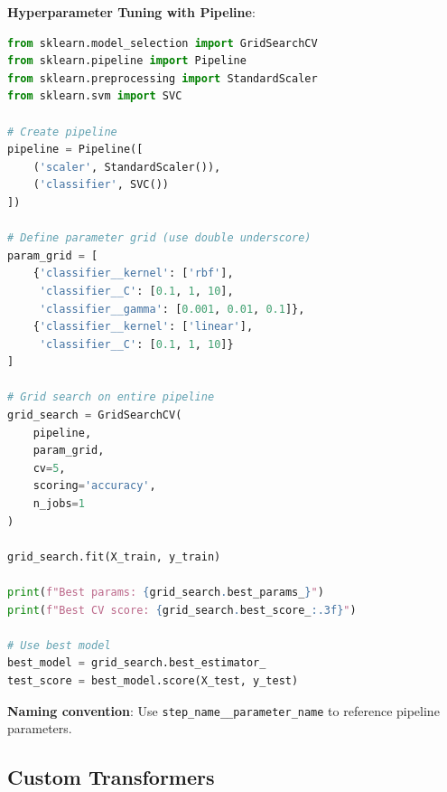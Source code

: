 \documentclass[11pt,twoside]{article}
\numberwithin{equation}{section}
\theoremstyle{plain}
\theoremstyle{definition}
\theoremstyle{remark}
\begin{document}
\begin{implementationbox}
\textbf{Hyperparameter Tuning with Pipeline}:

\begin{lstlisting}[language=Python]
from sklearn.model_selection import GridSearchCV
from sklearn.pipeline import Pipeline
from sklearn.preprocessing import StandardScaler
from sklearn.svm import SVC

# Create pipeline
pipeline = Pipeline([
    ('scaler', StandardScaler()),
    ('classifier', SVC())
])

# Define parameter grid (use double underscore)
param_grid = [
    {'classifier__kernel': ['rbf'],
     'classifier__C': [0.1, 1, 10],
     'classifier__gamma': [0.001, 0.01, 0.1]},
    {'classifier__kernel': ['linear'],
     'classifier__C': [0.1, 1, 10]}
]

# Grid search on entire pipeline
grid_search = GridSearchCV(
    pipeline, 
    param_grid, 
    cv=5, 
    scoring='accuracy',
    n_jobs=1
)

grid_search.fit(X_train, y_train)

print(f"Best params: {grid_search.best_params_}")
print(f"Best CV score: {grid_search.best_score_:.3f}")

# Use best model
best_model = grid_search.best_estimator_
test_score = best_model.score(X_test, y_test)
\end{lstlisting}

\textbf{Naming convention}: Use \texttt{step\_name\_\_parameter\_name} to reference pipeline parameters.
\end{implementationbox}

\subsection{Custom Transformers}
\end{document}
